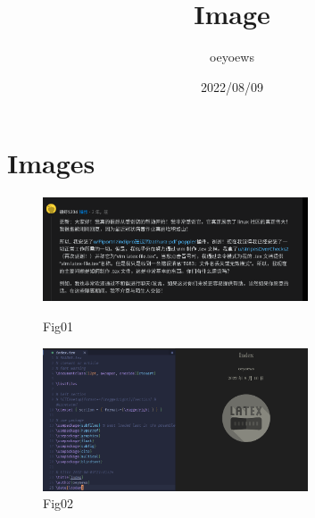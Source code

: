 \documentclass{article}
\title{Image \emoji{book}}
\author{oeyoews}
\date{2022/08/09}
\begin{document}
\maketitle


\section{Images }
\label{sec:img}

\begin{figure}[H]
	\centering
	\includegraphics[width=0.7\textwidth]{img/01.png}
	\caption{Fig01}
	\label{Fig01}
	\includegraphics[width=0.7\textwidth]{img/02.png}
	\caption{Fig02}
	\label{Fig02}
\end{figure}
\end{document}

